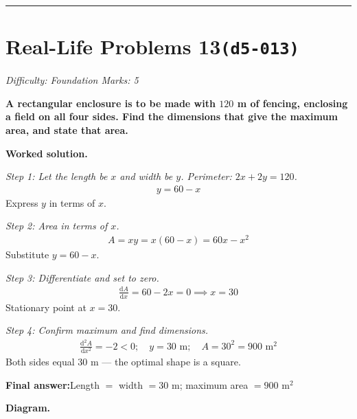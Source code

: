 \documentclass[11pt]{article}
\newcommand{\question}[1]{\par\medskip\noindent\textbf{#1}\par}
\begin{document}
\medskip\hrule

\section*{Real-Life Problems 13\quad\small\texttt{(d5-013)}}
\textit{Difficulty: Foundation \quad\textbar\quad Marks: 5}

\question{A rectangular enclosure is to be made with \( 120 \) m of fencing, enclosing a field on all four sides. Find the dimensions that give the maximum area, and state that area.}

\textbf{Worked solution.}

\textit{Step 1: Let the length be \( x \) and width be \( y \). Perimeter: \( 2x + 2y = 120 \).}
\[\begin{gathered}
y = 60 - x
\end{gathered}\]
Express \( y \) in terms of \( x \).

\textit{Step 2: Area in terms of \( x \).}
\[\begin{gathered}
A = xy = x(60 - x) = 60x - x^2
\end{gathered}\]
Substitute \( y = 60 - x \).

\textit{Step 3: Differentiate and set to zero.}
\[\begin{gathered}
\frac{\mathrm{d}A}{\mathrm{d}x} = 60 - 2x = 0 \implies x = 30
\end{gathered}\]
Stationary point at \( x = 30 \).

\textit{Step 4: Confirm maximum and find dimensions.}
\[\begin{gathered}
\frac{\mathrm{d}^2A}{\mathrm{d}x^2} = -2 < 0; \quad y = 30 \text{ m}; \quad A = 30^2 = 900 \text{ m}^2
\end{gathered}\]
Both sides equal 30 m --- the optimal shape is a square.

\begin{answerbox}
\textbf{Final answer:}\quad Length \(\displaystyle  = \) width \(\displaystyle  = 30 \) m; maximum area \(\displaystyle  = 900 \text{ m}^2 \)
\end{answerbox}
\textbf{Diagram.}
\end{document}
